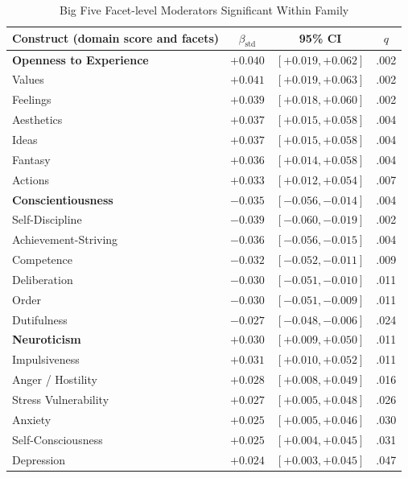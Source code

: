 \begin{table}[H]
\floatleft
\caption{Big Five Facet-level Moderators Significant Within Family}
\label{tab:facets}
\vspace{2pt}
\begingroup\small
\begin{tabularx}{\linewidth}{@{}Yccc@{}}
\toprule
Construct (domain score and facets) & $\beta_{\text{std}}$ & 95\% CI & $q$ \\
\midrule
\textbf{Openness to Experience} & $+0.040$ & $[+0.019, +0.062]$ & .002 \\
\quad Values & $+0.041$ & $[+0.019, +0.063]$ & .002 \\
\quad Feelings & $+0.039$ & $[+0.018, +0.060]$ & .002 \\
\quad Aesthetics & $+0.037$ & $[+0.015, +0.058]$ & .004 \\
\quad Ideas & $+0.037$ & $[+0.015, +0.058]$ & .004 \\
\quad Fantasy & $+0.036$ & $[+0.014, +0.058]$ & .004 \\
\quad Actions & $+0.033$ & $[+0.012, +0.054]$ & .007 \\
\addlinespace
\textbf{Conscientiousness} & $-0.035$ & $[-0.056, -0.014]$ & .004 \\
\quad Self-Discipline & $-0.039$ & $[-0.060, -0.019]$ & .002 \\
\quad Achievement-Striving & $-0.036$ & $[-0.056, -0.015]$ & .004 \\
\quad Competence & $-0.032$ & $[-0.052, -0.011]$ & .009 \\
\quad Deliberation & $-0.030$ & $[-0.051, -0.010]$ & .011 \\
\quad Order & $-0.030$ & $[-0.051, -0.009]$ & .011 \\
\quad Dutifulness & $-0.027$ & $[-0.048, -0.006]$ & .024 \\
\addlinespace
\textbf{Neuroticism} & $+0.030$ & $[+0.009, +0.050]$ & .011 \\
\quad Impulsiveness & $+0.031$ & $[+0.010, +0.052]$ & .011 \\
\quad Anger / Hostility & $+0.028$ & $[+0.008, +0.049]$ & .016 \\
\quad Stress Vulnerability & $+0.027$ & $[+0.005, +0.048]$ & .026 \\
\quad Anxiety & $+0.025$ & $[+0.005, +0.046]$ & .030 \\
\quad Self-Consciousness & $+0.025$ & $[+0.004, +0.045]$ & .031 \\
\quad Depression & $+0.024$ & $[+0.003, +0.045]$ & .047 \\
\bottomrule
\end{tabularx}
\endgroup
{}
\end{table}

